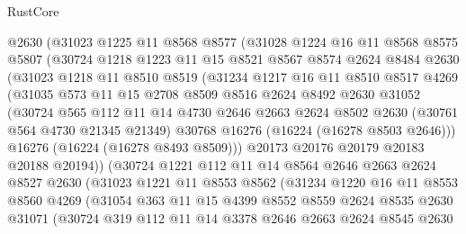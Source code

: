 \begin{lexlean}{RustCore}
\begin{coremodule}
      @2630
      (@31023
        @1225
        @11
        @8568
        @8577
        (@31028
          @1224
          @16
          @11
          @8568
          @8575
          @5807
          (@30724
            @1218
            @1223
            @11
            @15
            @8521
            @8567
            @8574
            @2624
            @8484
            @2630
            (@31023
              @1218
              @11
              @8510
              @8519
              (@31234
                @1217
                @16
                @11
                @8510
                @8517
                @4269
                (@31035
                  @573
                  @11
                  @15
                  @2708
                  @8509
                  @8516
                  @2624
                  @8492
                  @2630
                  @31052
                  (@30724
                    @565
                    @112
                    @11
                    @14
                    @4730
                    @2646
                    @2663
                    @2624
                    @8502
                    @2630
                    (@30761 @564 @4730 @21345 @21349)
                    @30768
                    @16276
                    (@16224 (@16278 @8503 @2646)))
                  @16276
                  (@16224 (@16278 @8493 @8509)))
                @20173
                @20176
                @20179
                @20183
                @20188
                @20194))
            (@30724
              @1221
              @112
              @11
              @14
              @8564
              @2646
              @2663
              @2624
              @8527
              @2630
              (@31023
                @1221
                @11
                @8553
                @8562
                (@31234
                  @1220
                  @16
                  @11
                  @8553
                  @8560
                  @4269
                  (@31054
                    @363
                    @11
                    @15
                    @4399
                    @8552
                    @8559
                    @2624
                    @8535
                    @2630
                    @31071
                    (@30724
                      @319
                      @112
                      @11
                      @14
                      @3378
                      @2646
                      @2663
                      @2624
                      @8545
                      @2630

\end{coremodule}
\end{lexlean}
